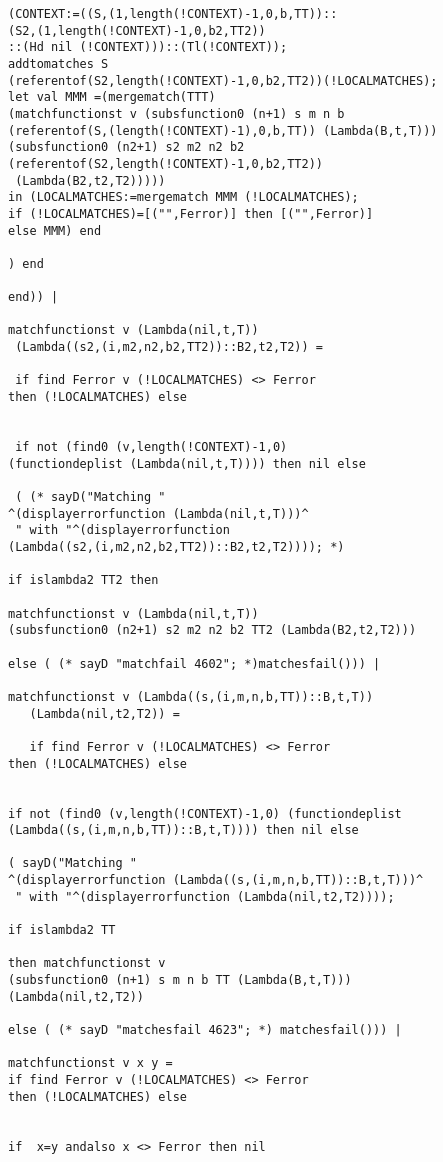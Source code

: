 \documentclass[12pt]{article}
\begin{document}
\begin{verbatim}
(CONTEXT:=((S,(1,length(!CONTEXT)-1,0,b,TT))::
(S2,(1,length(!CONTEXT)-1,0,b2,TT2))
::(Hd nil (!CONTEXT)))::(Tl(!CONTEXT));
addtomatches S 
(referentof(S2,length(!CONTEXT)-1,0,b2,TT2))(!LOCALMATCHES);
let val MMM =(mergematch(TTT)
(matchfunctionst v (subsfunction0 (n+1) s m n b 
(referentof(S,(length(!CONTEXT)-1),0,b,TT)) (Lambda(B,t,T)))
(subsfunction0 (n2+1) s2 m2 n2 b2 
(referentof(S2,length(!CONTEXT)-1,0,b2,TT2))
 (Lambda(B2,t2,T2)))))
in (LOCALMATCHES:=mergematch MMM (!LOCALMATCHES);
if (!LOCALMATCHES)=[("",Ferror)] then [("",Ferror)]
else MMM) end 

) end

end)) |

matchfunctionst v (Lambda(nil,t,T)) 
 (Lambda((s2,(i,m2,n2,b2,TT2))::B2,t2,T2)) =
 
 if find Ferror v (!LOCALMATCHES) <> Ferror 
then (!LOCALMATCHES) else

 
 if not (find0 (v,length(!CONTEXT)-1,0) 
(functiondeplist (Lambda(nil,t,T)))) then nil else
 
 ( (* sayD("Matching "
^(displayerrorfunction (Lambda(nil,t,T)))^
 " with "^(displayerrorfunction 
(Lambda((s2,(i,m2,n2,b2,TT2))::B2,t2,T2)))); *)

if islambda2 TT2 then

matchfunctionst v (Lambda(nil,t,T))
(subsfunction0 (n2+1) s2 m2 n2 b2 TT2 (Lambda(B2,t2,T2))) 

else ( (* sayD "matchfail 4602"; *)matchesfail())) |

matchfunctionst v (Lambda((s,(i,m,n,b,TT))::B,t,T))
   (Lambda(nil,t2,T2)) = 
   
   if find Ferror v (!LOCALMATCHES) <> Ferror 
then (!LOCALMATCHES) else

   
if not (find0 (v,length(!CONTEXT)-1,0) (functiondeplist 
(Lambda((s,(i,m,n,b,TT))::B,t,T)))) then nil else
   
( sayD("Matching "
^(displayerrorfunction (Lambda((s,(i,m,n,b,TT))::B,t,T)))^
 " with "^(displayerrorfunction (Lambda(nil,t2,T2)))); 

if islambda2 TT 

then matchfunctionst v
(subsfunction0 (n+1) s m n b TT (Lambda(B,t,T)))
(Lambda(nil,t2,T2))

else ( (* sayD "matchesfail 4623"; *) matchesfail())) |

matchfunctionst v x y = 
if find Ferror v (!LOCALMATCHES) <> Ferror 
then (!LOCALMATCHES) else


if  x=y andalso x <> Ferror then nil


\end{verbatim}
\end{document}
